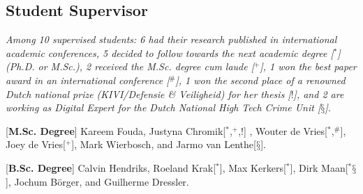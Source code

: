 \documentclass[print]{styles/friggeri-cv-mac} %
\begin{document}
\newpage
\subsection{Student Supervisor}\vspace{-5pt}

\textit{Among 10 supervised students: 6 had their research published in
international academic conferences, 5 decided to follow towards the next
academic degree [$^*$] (Ph.D. or M.Sc.), 2 received the M.Sc. degree
\textit{cum laude} [$^+$], 1 won the best paper award in an international
conference [$^\#$], 1 won the second place of a renowned Dutch national
prize (KIVI/Defensie \& Veiligheid) for her thesis [$!$], and 2 are working as Digital Expert for the Dutch National High Tech Crime Unit [$§$].}

\begin{entrylist}
\vspace{-0.3cm}
\entry
{[\textbf{M.Sc. Degree}]}
{\textnormal{Kareem Fouda, Justyna Chromik[$^*$,$^+$,$!$] , Wouter de Vries[$^*$,$^\#$], Joey de Vries[$^+$], Mark Wierbosch, and Jarmo van Lenthe[$§$].}}
{}

\vspace{-0.3cm}
\entry
{[\textbf{B.Sc. Degree}]}
{\textnormal{Calvin Hendriks, Roeland Krak[$^*$], Max Kerkers[$^*$], Dirk Maan[$^*§$], Jochum Börger, and Guilherme Dressler.}} 
{}

\end{entrylist}


\end{document}
